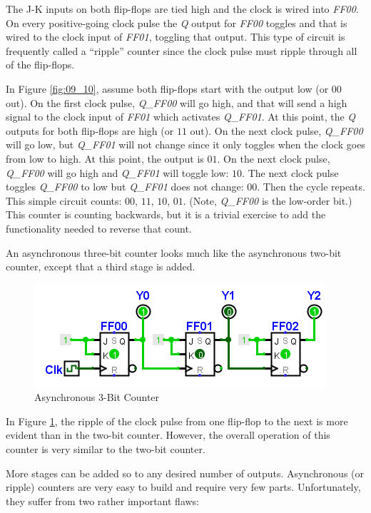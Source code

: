 The J-K inputs on both flip-flops are tied high and the clock is wired into \emph{FF00}. On every positive-going clock pulse the \emph{Q} output for \emph{FF00} toggles and that is wired to the clock input of \emph{FF01}, toggling that output. This type of circuit is frequently called a ``ripple'' counter since the clock pulse must ripple through all of the flip-flops.

In Figure \ref{fig:09_10}, assume both flip-flops start with the output low (or $ 00 $ out). On the first clock pulse, \emph{Q\_FF00} will go high, and that will send a high signal to the clock input of \emph{FF01} which activates \emph{Q\_FF01}. At this point, the \emph{Q} outputs for both flip-flops are high (or $ 11 $ out). On the next clock pulse, \emph{Q\_FF00} will go low, but \emph{Q\_FF01} will not change since it only toggles when the clock goes from low to high. At this point, the output is $ 01 $. On the next clock pulse, \emph{Q\_FF00} will go high and \emph{Q\_FF01} will toggle low: $ 10 $. The next clock pulse toggles \emph{Q\_FF00} to low but \emph{Q\_FF01} does not change: $ 00 $. Then the cycle repeats. This simple circuit counts: $ 00 $, $ 11 $, $ 10 $, $ 01 $. (Note, \emph{Q\_FF00} is the low-order bit.) This counter is counting backwards, but it is a trivial exercise to add the functionality needed to reverse that count.

An asynchronous three-bit counter looks much like the asynchronous two-bit counter, except that a third stage is added.

\begin{figure}[H]
	\centering
	\includegraphics[width=\maxwidth{.95\linewidth}]{gfx/09_11}
	\caption{Asynchronous 3-Bit Counter}
	\label{fig:09_11}
\end{figure}

In Figure \ref{fig:09_11}, the ripple of the clock pulse from one flip-flop to the next is more evident than in the two-bit counter. However, the overall operation of this counter is very similar to the two-bit counter.

More stages can be added so to any desired number of outputs. Asynchronous (or ripple) counters are very easy to build and require very few parts. Unfortunately, they suffer from two rather important flaws:

